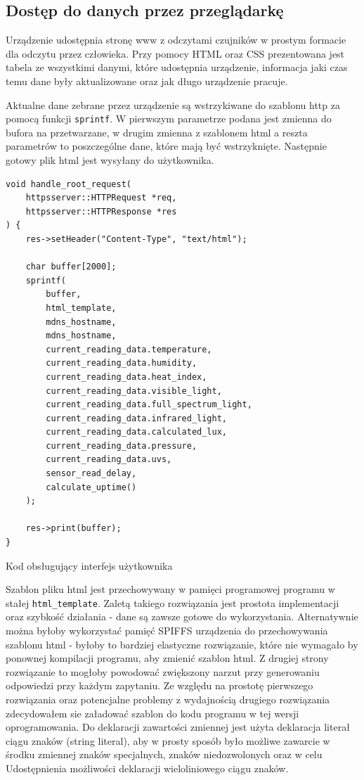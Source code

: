 \documentclass[12pt,a4paper]{article}
\begin{document}
\subsection{Dostęp do danych przez przeglądarkę}

Urządzenie udostępnia stronę www z odczytami czujników w prostym formacie dla odczytu przez człowieka. 
Przy pomocy HTML oraz CSS prezentowana jest tabela ze wszystkimi danymi, które udostępnia urządzenie, informacja jaki czas temu
dane były aktualizowane oraz jak długo urządzenie pracuje.

Aktualne dane zebrane przez urządzenie są wstrzykiwane do szablonu http za pomocą funkcji \texttt{sprintf}. W pierwszym parametrze podana jest
zmienna do bufora na przetwarzane, w drugim zmienna z szablonem html a reszta parametrów to poszczególne dane, które mają być wstrzyknięte.
Następnie gotowy plik html jest wysyłany do użytkownika.

\begin{code}[H]
\begin{verbatim}
void handle_root_request(
    httpsserver::HTTPRequest *req, 
    httpsserver::HTTPResponse *res
) {
    res->setHeader("Content-Type", "text/html");

    char buffer[2000];
    sprintf(
        buffer, 
        html_template,
        mdns_hostname,
        mdns_hostname,
        current_reading_data.temperature,
        current_reading_data.humidity,
        current_reading_data.heat_index,
        current_reading_data.visible_light,
        current_reading_data.full_spectrum_light,
        current_reading_data.infrared_light,
        current_reading_data.calculated_lux,
        current_reading_data.pressure,
        current_reading_data.uvs,
        sensor_read_delay,
        calculate_uptime()
    );

    res->print(buffer);
}
\end{verbatim}
\caption{Kod obsługujący interfejs użytkownika}
\label{user-interface-code}
\end{code}

Szablon pliku html jest przechowywany w pamięci programowej programu w stałej \texttt{html\_template}. Zaletą takiego rozwiązania jest prostota implementacji
oraz szybkość działania - dane są zawsze gotowe do wykorzystania. Alternatywnie można byłoby wykorzystać pamięć SPIFFS urządzenia do przechowywania szablonu
html - byłoby to bardziej elastyczne rozwiązanie, które nie wymagało by ponownej kompilacji programu, aby zmienić szablon html. Z drugiej strony rozwiązanie to
mogłoby powodować zwiększony narzut przy generowaniu odpowiedzi przy każdym zapytaniu. Ze względu na prostotę pierwszego rozwiązania oraz potencjalne
problemy z wydajnością drugiego rozwiązania zdecydowałem sie załadować szablon do kodu programu w tej wersji oprogramowania.
Do deklaracji zawartości zmiennej jest użyta deklaracja literał ciągu znaków (string literal), aby w prosty sposób było możliwe zawarcie w środku 
zmiennej znaków specjalnych, znaków niedozwolonych oraz w celu Udostępnienia możliwości deklaracji wieloliniowego ciągu znaków.
\end{document}
